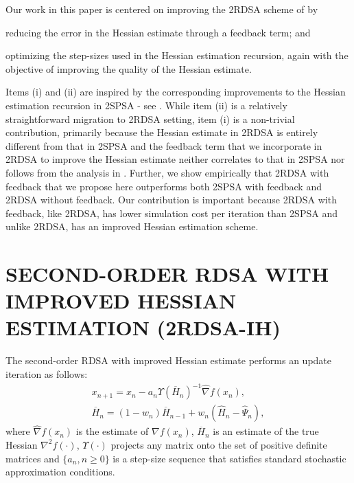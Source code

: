 \documentclass[letterpaper, 10 pt, conference]{ieeeconf}  %
\begin{document}
Our work in this paper is centered on improving the 2RDSA scheme of \cite{prashanth2015rdsa} by 
\begin{inparaenum}[\bfseries (i)]
\item reducing the error in the Hessian estimate through a feedback term; and
\item optimizing the step-sizes used in the Hessian estimation recursion, again with the objective of improving the quality of the Hessian estimate.
\end{inparaenum}

Items (i) and (ii) are inspired by the corresponding improvements to the Hessian estimation recursion in 2SPSA - see \cite{spall-jacobian}. While item (ii) is a relatively straightforward migration to 2RDSA setting, item (i) is a non-trivial contribution, primarily because the Hessian estimate in 2RDSA is entirely different from that in 2SPSA and the feedback term that we incorporate in 2RDSA to improve the Hessian estimate neither correlates to that in 2SPSA nor follows from the analysis in \cite{spall-jacobian}. Further, we show empirically that 2RDSA with feedback that we propose here outperforms both 2SPSA with feedback and 2RDSA without feedback. Our contribution is important because 2RDSA with feedback, like 2RDSA, has lower simulation cost per iteration than 2SPSA and unlike 2RDSA, has an improved Hessian estimation scheme.

\section{SECOND-ORDER RDSA WITH IMPROVED HESSIAN ESTIMATION (2RDSA-IH)}
The second-order RDSA with improved Hessian estimate performs an update iteration as follows:
\begin{align}
\label{eq:e2rdsa}
x_{n+1} = x_n - a_n \Upsilon(\overline H_n)^{-1}\widehat\nabla f(x_n), \\
\overline H_n = (1-w_{n})  \overline H_{n-1} + w_{n} ( \widehat H_n - \widehat \Psi_n),\label{eq:2rdsa-H}
\end{align}
where $\widehat\nabla f(x_n)$ is the estimate of $\nabla f(x_n)$, 
$\overline H_n$ is an estimate of the true Hessian ${\nabla}^2 f(\cdot)$, $\Upsilon(\cdot)$ projects any matrix onto the set of positive definite matrices and $\{a_n, n\ge 0\}$ is a step-size sequence that satisfies standard stochastic approximation conditions.  
\end{document}
